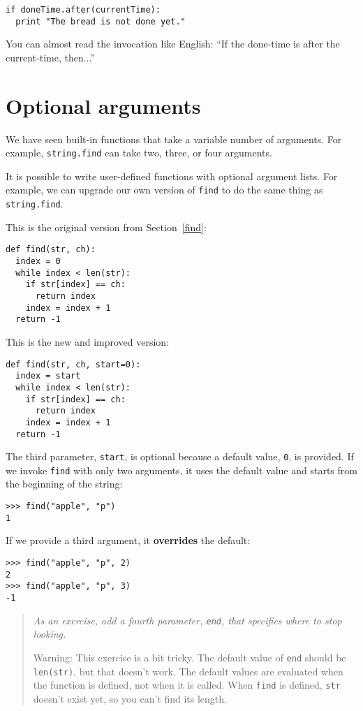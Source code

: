 \beforeverb
\begin{verbatim}
if doneTime.after(currentTime):
  print "The bread is not done yet."
\end{verbatim}
\afterverb
%
You can almost read the invocation like English: ``If the done-time is
after the current-time, then...''


\section{Optional arguments}

We have seen built-in functions that take a variable number of
arguments.  For example, {\tt string.find} can take two, three, or
four arguments.

It is possible to write user-defined functions with optional argument
lists.  For example, we can upgrade our own version of {\tt find} to do
the same thing as {\tt string.find}.

This is the original version from Section~\ref{find}:

\beforeverb
\begin{verbatim}
def find(str, ch):
  index = 0
  while index < len(str):
    if str[index] == ch:
      return index
    index = index + 1
  return -1
\end{verbatim}
\afterverb
%
This is the new and improved version:

\beforeverb
\begin{verbatim}
def find(str, ch, start=0):
  index = start
  while index < len(str):
    if str[index] == ch:
      return index
    index = index + 1
  return -1
\end{verbatim}
\afterverb
%
The third parameter, {\tt start}, is optional because a default value,
{\tt 0}, is provided.  If we invoke {\tt find} with only two
arguments, it uses the default value and starts from the beginning of
the string:

\beforeverb
\begin{verbatim}
>>> find("apple", "p")
1
\end{verbatim}
\afterverb
%
If we provide a third argument, it {\bf overrides} the default:

\beforeverb
\begin{verbatim}
>>> find("apple", "p", 2)
2
>>> find("apple", "p", 3)
-1
\end{verbatim}
\afterverb
%
\begin{quote}
{\em As an exercise, add a fourth parameter, {\tt end}, that specifies where
to stop looking.

Warning: This exercise is a bit tricky.  The default value of
{\tt end} should be {\tt len(str)}, but that doesn't work.  The
default values are evaluated when the function is defined, not when it
is called.  When {\tt find} is defined, {\tt str} doesn't exist yet,
so you can't find its length.}
\end{quote}


